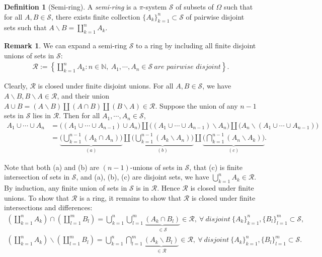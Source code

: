 \documentclass{article}
\numberwithin{equation}{section}
\theoremstyle{plain}
\theoremstyle{definition}
\newtheorem{definition}[theorem]{Definition}
\newtheorem*{remark}{Remark}
\begin{document}
\begin{definition}[Semi-ring]\label{def:1.24} A \textit{semi-ring} is a $\pi$-system $\mathscr{S}$ of subsets of $\Omega$ such that for all $A,B\in\mathscr{S}$, there exists finite collection $\{A_k\}_{k=1}^n\subset\mathscr{S}$ of pairwise disjoint sets such that $A\backslash B=\coprod_{k=1}^n A_k$.
\end{definition}
\begin{remark}
We can expand a semi-ring $\mathscr{S}$ to a ring by including all finite disjoint unions of sets in $\mathscr{S}$:
\begin{align*}
	\mathscr{R}:=\left\{\coprod_{k=1}^n A_k: n\in\mathbb{N},\  A_1,\cdots,A_n\in\mathscr{S}\ \textit{are pairwise disjoint}\right\}.
\end{align*}

Clearly, $\mathscr{R}$ is closed under finite disjoint unions. For all $A,B\in\mathscr{S}$, we have $A\backslash B,B\backslash A\in\mathscr{R}$, and their union $A\cup B=(A\backslash B)\amalg(A\cap B)\amalg(B\backslash A)\in\mathscr{R}$. Suppose the union of any $n-1$ sets in $\mathscr{S}$ lies in $\mathscr{R}$. Then for all $A_1,\cdots,A_n\in\mathscr{S}$,
\begin{align*}
	A_1\cup\cdots\cup A_n &= \bigl((A_1\cup\cdots\cup A_{n-1})\cup A_n\bigr)\amalg \bigl((A_1\cup\cdots\cup A_{n-1})\backslash A_n\bigr)  \amalg\bigl(A_n\backslash (A_1\cup\cdots\cup A_{n-1})\bigr)\\
	&=\underbrace{\biggl(\bigcup_{k=1}^{n-1}(A_k\cap A_n)\biggr)}_{(a)}\amalg \underbrace{\biggl(\bigcup_{k=1}^{n-1}(A_k\backslash A_n)\biggr)}_{(b)} \amalg \underbrace{\biggl(\bigcap_{k=1}^{n-1}(A_n\backslash A_k)\biggr)}_{(c)}.
\end{align*}

Note that both (a) and (b) are $(n-1)$-unions of sets in $\mathscr{S}$, that (c) is finite intersection of sets in $\mathscr{S}$, and (a), (b), (c) are disjoint sets, we have $\bigcup_{k=1}^n A_k\in\mathscr{R}$. By induction, any finite union of sets in $\mathscr{S}$ is in $\mathscr{R}$. Hence $\mathscr{R}$ is closed under finite unions. To show that $\mathscr{R}$ is a ring, it remains to show that $\mathscr{R}$ is closed under finite intersections and differences:
\begin{align*}
	\left(\coprod_{k=1}^n A_k\right)\cap\left(\coprod_{l=1}^m B_l\right) = \bigcup_{k=1}^n\bigcup_{l=1}^m\underbrace{(A_k\cap B_l)}_{\in\mathscr{S}}\in\mathscr{R},\ \forall\ \textit{disjoint}\  \{A_k\}_{k=1}^n,\{B_l\}_{l=1}^m\subset\mathscr{S},\\
	\left(\coprod_{k=1}^n A_k\right)\backslash\left(\coprod_{l=1}^m B_l\right) = \bigcup_{k=1}^n\bigcap_{l=1}^m\underbrace{(A_k\backslash  B_l)}_{\in\mathscr{R}}\in\mathscr{R},\ \forall\ \textit{disjoint}\  \{A_k\}_{k=1}^n,\{B_l\}_{l=1}^m\subset\mathscr{S}.
\end{align*}


\end{remark}
\end{document}
